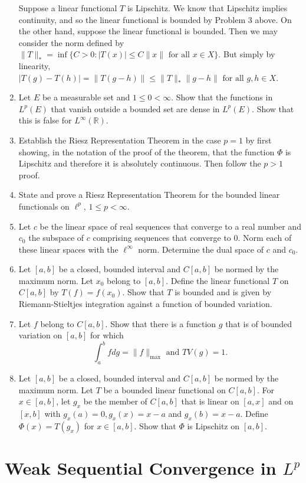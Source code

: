 \begin{enumerate}
    Suppose a linear functional $T$ is Lipschitz. We know that Lipschitz implies continuity, and so the linear functional is bounded by Problem 3 above.
    On the other hand, suppose the linear functional is bounded.
    Then we may consider the norm defined by $\|T\|_*=\inf\{C>0:|T(x)|\le C\|x\|\text{ for all }x\in X\}$.
    But simply by linearity, $|T(g)-T(h)|=\|T(g-h)\|\le \|T\|_*\|g-h\|\text{ for all }g,h\in X$.
    \item Let $E$ be a measurable set and $1\le 0<\infty$. Show that the functions in $L^p(E)$ that vanish outside a bounded set are dense in $L^p(E)$. Show that this is false for $L^\infty(\mathbb{R})$.
    \item Establish the Riesz Representation Theorem in the case $p=1$ by first showing, in the notation of the proof of the theorem, that the function $\Phi$ is Lipschitz and therefore it is absolutely continuous. Then follow the $p>1$ proof.
    \item State and prove a Riesz Representation Theorem for the bounded linear functionals on $\ell^p$, $1\le p<\infty$.
    \item Let $c$ be the linear space of real sequences that converge to a real number and $c_0$ the subspace of $c$ comprising sequences that converge to $0$. Norm each of these linear spaces with the $\ell^\infty$ norm. Determine the dual space of $c$ and $c_0$.
    \item Let $[a,b]$ be a closed, bounded interval and $C[a,b]$ be normed by the maximum norm. Let $x_0$ belong to $[a,b]$. Define the linear functional $T$ on $C[a,b]$ by $T(f)=f(x_0)$. Show that $T$ is bounded and is given by Riemann-Stieltjes integration against a function of bounded variation.
    \item Let $f$ belong to $C[a,b]$. Show that there is a function $g$ that is of bounded variation on $[a,b]$ for which 
    \[
        \int_a^bfdg=\|f\|_{\max}\text{ and }TV(g)=1.  
    \]
    \item Let $[a,b]$ be a closed, bounded interval and $C[a,b]$ be normed by the maximum norm. Let $T$ be a bounded linear functional on $C[a,b]$.
    For $x\in[a,b]$, let $g_x$ be the member of $C[a,b]$ that is linear on $[a,x]$ and on $[x,b]$ with $g_x(a)=0,g_x(x)=x-a$ and $g_x(b)=x-a$. Define $\Phi(x)=T(g_x)$ for $x\in[a,b]$. Show that $\Phi$ is Lipschitz on $[a,b]$.
\end{enumerate}

\section{Weak Sequential Convergence in $L^p$}

